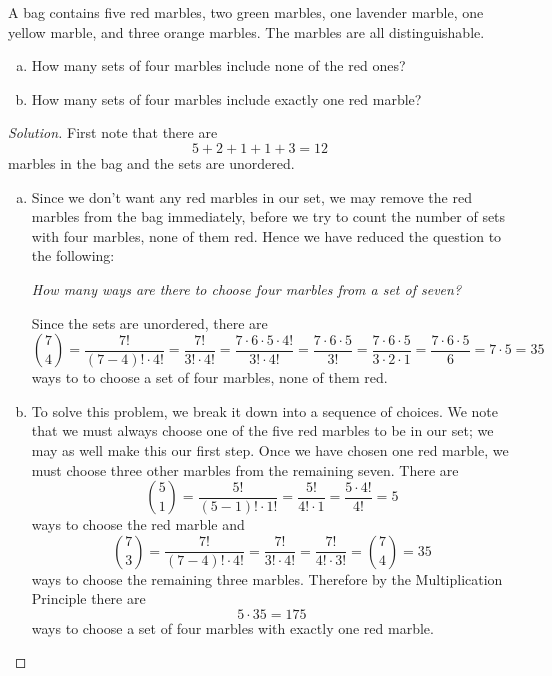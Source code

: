 \documentclass[12pt]{amsart}
\begin{document}
\newpage
\begin{thm}[20 Points]\label{ex2}
  A bag contains five red marbles, two green marbles, one lavender marble, one yellow marble, and three orange marbles.
  The marbles are all distinguishable.
  \begin{enumerate}[(a)]
  \item
    How many sets of four marbles include none of the red ones?
  \item
    How many sets of four marbles include exactly one red marble?
  \end{enumerate}  
  \begin{proof}[Solution]
    First note that there are 
      $$5 + 2 + 1 + 1 + 3 = 12$$ 
      marbles in the bag and the sets are unordered.
    \begin{enumerate}[(a)]
    \item
      Since we don't want any red marbles in our set, we may remove the red marbles from the bag immediately, before we try to count the number of sets with four marbles, none of them red.
      Hence we have reduced the question to the following:
      \begin{center}
        {\it How many ways are there to choose four marbles from a set of seven?}
      \end{center}
      Since the sets are unordered, there are 
      $${7 \choose 4} = \frac{7!}{(7-4)! \cdot 4!} 
      = \frac{7!}{3! \cdot 4!} 
      = \frac{7 \cdot 6 \cdot 5 \cdot 4!}{3!\cdot 4!}
      = \frac{7 \cdot 6 \cdot 5}{3!}
      = \frac{7 \cdot 6 \cdot 5}{3 \cdot 2 \cdot 1}
      = \frac{7 \cdot 6 \cdot 5}{6}
      = 7 \cdot 5
      = 35$$
      ways to to choose a set of four marbles, none of them red.
    \item
      To solve this problem, we break it down into a sequence of choices.
      We note that we must always choose one of the five red marbles to be in our set; we may as well make this our first step.
      Once we have chosen one red marble, we must choose three other marbles from the remaining seven.
      There are 
      $${5 \choose 1} = \frac{5!}{(5 - 1)!\cdot1!}
      = \frac{5!}{4!\cdot 1}
      = \frac{5 \cdot 4!}{4!}
      = 5$$
      ways to choose the red marble and 
      $${7 \choose 3} = \frac{7!}{(7-4)! \cdot 4!}
      = \frac{7!}{3! \cdot 4!}
      = \frac{7!}{4! \cdot 3!}
      = {7 \choose 4}
      = 35$$
      ways to choose the remaining three marbles.
      Therefore by the Multiplication Principle there are 
      $$5 \cdot 35 = 175$$
      ways to choose a set of four marbles with exactly one red marble.
    \end{enumerate}
  \end{proof}
\end{thm}
\end{document}
